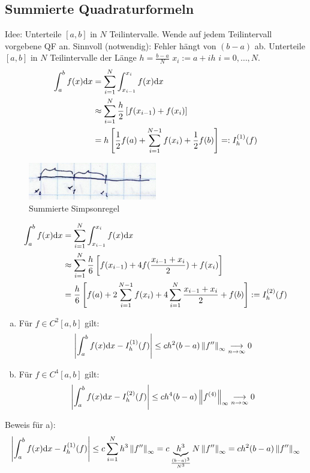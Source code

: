 \subsection{Summierte Quadraturformeln}
Idee: Unterteile $[a,b]$ in $N$ Teilintervalle. Wende auf jedem Teilintervall vorgebene QF an.
Sinnvoll (notwendig): Fehler hängt von $(b-a)$ ab.
Unterteile $[a,b]$ in $N$ Teilintervalle der Länge $h=\frac{b-a}{N}$ $x_i := a + ih$ $i=0,\ldots,N$.
\begin{align*}
  \int_a^b f(x) \mathrm{d}x &= \sum^{N}_{i=1} \int_{x_{i-1}}^{x_i} f(x) \mathrm{d}x\\
  &\approx \sum^{N}_{i=1} \frac{h}{2} \left[f(x_{i-1}) + f(x_i)\right] \\
  &= h\left[\frac{1}{2} f(a) + \sum^{N-1}_{i=1} f(x_i) + \frac{1}{2} f(b)\right] =: I_h^{(1)}(f)
\end{align*}
\begin{figure}[htbp]
  \centering
  \includegraphics[width=0.5\textwidth]{figures/sum_simpson.png}
  \caption{Summierte Simpsonregel}
\end{figure}
\begin{align*}
  \int_a^b f(x) \mathrm{d}x &= \sum^{N}_{i=1} \int_{x_{i-1}}^{x_i} f(x) \mathrm{d}x\\
  &\approx \sum^{N}_{i=1} \frac{h}{6} \left[f(x_{i-1}) + 4f(\frac{x_{i-1}+x_i}{2}) + f(x_i)\right] \\
  &= \frac{h}{6} \left[ f(a) + 2 \sum^{N-1}_{i=1} f(x_i) + 4 \sum^{N}_{i=1} \frac{x_{i-1}+x_i}{2} + f(b) \right] := I_h^{(2)}(f)
\end{align*}
\begin{enumerate}[a)]
  \item Für $f \in C^2[a, b]$ gilt: \begin{align*}
    \left| \int_a^b f(x) \mathrm{d}x - I_h^{(1)}(f) \right| \leq ch^2 (b-a) \left\lVert f'' \right\rVert_\infty \underset{n \to \infty}{\longrightarrow} 0
  \end{align*}
  \item Für $f \in C^4[a, b]$ gilt: \begin{align*}
      \left| \int_a^b f(x) \mathrm{d}x - I_h^{(2)}(f) \right| \leq ch^4 (b-a) \left\lVert f^{(4)} \right\rVert_\infty \underset{n \to \infty}{\longrightarrow} 0
  \end{align*}
\end{enumerate}
Beweis für a):
\begin{align*}
  \left| \int_a^b f(x) \mathrm{d}x - I_h^{(1)}(f) \right| \leq c \sum^{N}_{i=1} h^3 \left\lVert f'' \right\rVert_\infty = c \underbrace{h^3}_{\frac{(b-a)^3}{N^3}} N \left\lVert f'' \right\rVert_\infty = c h^2 (b-a) \left\lVert f'' \right\rVert_\infty
\end{align*}

